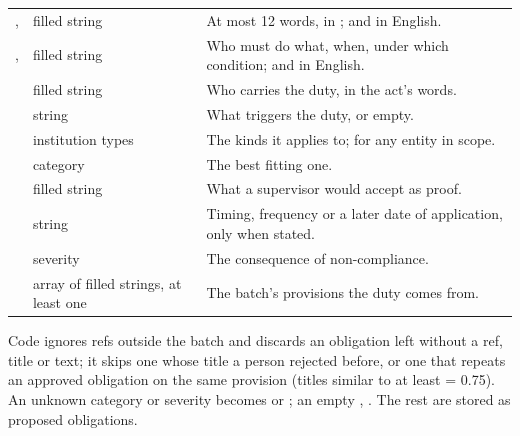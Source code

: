 \par\nopagebreak
\begin{xltabular}{\textwidth}{@{}L{40mm}L{28mm}Y@{}}
\toprule
{} &  &  \\
\midrule
\endhead
\bottomrule
\endlastfoot
{},  & filled string & At most 12 words, in ; and in English. \\
,  & filled string & Who must do what, when, under which condition; and in English. \\
 & filled string & Who carries the duty, in the act's words. \\
 & string & What triggers the duty, or empty. \\
 & institution types & The kinds it applies to;  for any entity in scope. \\
 & category & The best fitting one. \\
 & filled string & What a supervisor would accept as proof. \\
 & string & Timing, frequency or a later date of application, only when stated. \\
 & severity & The consequence of non-compliance. \\
 & array of filled strings, at least one & The batch's provisions the duty comes from. \\
\end{xltabular}

Code ignores refs outside the batch and discards an obligation left without a ref, title or
text; it skips one whose title a person rejected before, or one that repeats an approved
obligation on the same provision (titles similar to at least  = 0.75). An
unknown category or severity becomes  or ; an empty ,
. The rest are stored as proposed obligations.

